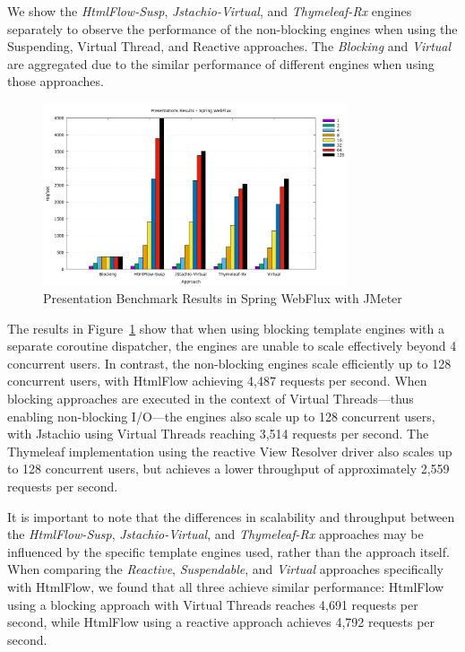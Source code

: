We show the \textit{HtmlFlow-Susp}, \textit{Jstachio-Virtual}, and
\textit{Thymeleaf-Rx} engines separately to observe the performance of the
non-blocking engines when using the Suspending, Virtual Thread, and Reactive
approaches. The \textit{Blocking} and \textit{Virtual} are aggregated due to
the similar performance of different engines when using those approaches.

\begin{figure}[h]
     \centering
     \includegraphics[width=0.8\textwidth]{./Graphs/presentations-webflux-jmeter.png}
     \caption{Presentation Benchmark Results in Spring WebFlux with JMeter}\label{fig:presentations-webflux-jmeter}
\end{figure}

The results in Figure~\ref{fig:presentations-webflux-jmeter} show that when
using blocking template engines with a separate coroutine dispatcher, the
engines are unable to scale effectively beyond 4 concurrent users. In contrast,
the non-blocking engines scale efficiently up to 128 concurrent users, with
HtmlFlow achieving 4,487 requests per second. When blocking approaches are
executed in the context of Virtual Threads—thus enabling non-blocking I/O—the
engines also scale up to 128 concurrent users, with Jstachio using Virtual
Threads reaching 3,514 requests per second. The Thymeleaf implementation using
the reactive View Resolver driver also scales up to 128 concurrent users, but
achieves a lower throughput of approximately 2,559 requests per second.

It is important to note that the differences in scalability and throughput
between the \textit{HtmlFlow-Susp}, \textit{Jstachio-Virtual}, and
\textit{Thymeleaf-Rx} approaches may be influenced by the specific template
engines used, rather than the approach itself. When comparing the
\textit{Reactive}, \textit{Suspendable}, and \textit{Virtual} approaches
specifically with HtmlFlow, we found that all three achieve similar
performance: HtmlFlow using a blocking approach with Virtual Threads reaches
4,691 requests per second, while HtmlFlow using a reactive approach achieves
4,792 requests per second.

